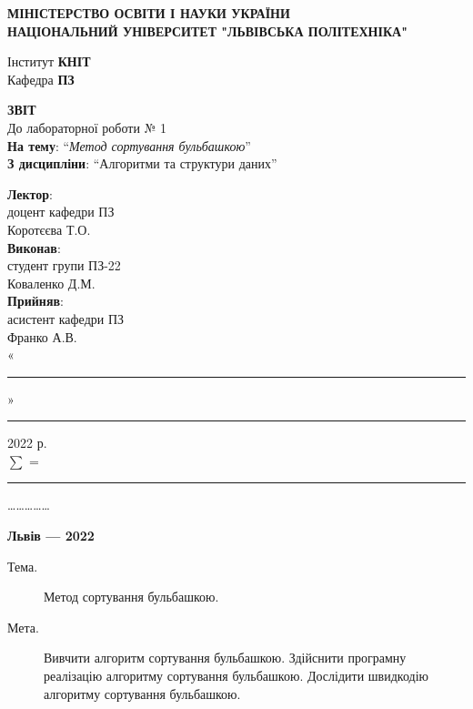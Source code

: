 \documentclass{article}
\newcommand\subject{Алгоритми та структури даних}
\newcommand\lecturer{доцент кафедри ПЗ\\Коротєєва Т.О.}
\newcommand\teacher{асистент кафедри ПЗ\\Франко А.В.}
\newcommand\mygroup{ПЗ-22}
\newcommand\lab{1}
\newcommand\theme{Метод сортування бульбашкою}
\newcommand\purpose{Вивчити алгоритм сортування бульбашкою. Здійснити програмну реалізацію алгоритму сортування бульбашкою. Дослідити швидкодію алгоритму сортування бульбашкою}
\begin{document}
\begin{normalsize}
	\begin{titlepage}
		\thispagestyle{empty}
		\begin{center}
			\textbf{МІНІСТЕРСТВО ОСВІТИ І НАУКИ УКРАЇНИ\\
				НАЦІОНАЛЬНИЙ УНІВЕРСИТЕТ "ЛЬВІВСЬКА ПОЛІТЕХНІКА"}
		\end{center}
		\begin{flushright}
			Інститут \textbf{КНІТ}\\
			Кафедра \textbf{ПЗ}
		\end{flushright}
		\vspace{200pt}
		\begin{center}
			\textbf{ЗВІТ}\\
			\vspace{10pt}
			До лабораторної роботи № \lab\\
			\textbf{На тему}: “\textit{\theme}”\\
			\textbf{З дисципліни}: “\subject”
		\end{center}
		\vspace{112pt}
		\begin{flushright}
			
			\textbf{Лектор}:\\
			\lecturer\\
			\vspace{28pt}
			\textbf{Виконав}:\\
			
			студент групи \mygroup\\
			Коваленко Д.М.\\
			\vspace{28pt}
			\textbf{Прийняв}:\\
			
			\teacher\\
			
			\vspace{28pt}
			«\rule{1cm}{0.15mm}» \rule{1.5cm}{0.15mm} 2022 р.\\
			$\sum$ = \rule{1cm}{0.15mm}……………\\
			
		\end{flushright}
		\vspace{\fill}
		\begin{center}
			\textbf{Львів — 2022}
		\end{center}
	\end{titlepage}
		
	\begin{description}
		\item[Тема.] \theme.
		\item[Мета.] \purpose.
	\end{description}


\end{normalsize}
\end{document}
